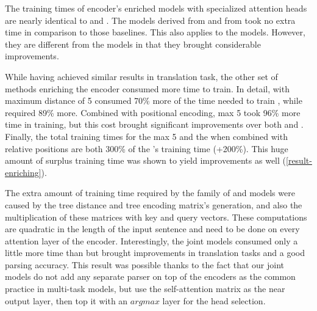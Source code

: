 The training times of encoder's enriched models with specialized attention heads are nearly identical to \transformerbase and \transformerrel.
The \SpecPOS models derived from \transformerbase and from \transformerrel took no extra time in comparison to those baselines.
This also applies to the \SpecDep models. 
However, they are different from the \SpecPOS models in that they brought considerable improvements.

While having achieved similar results in translation task, the other set of methods enriching the encoder consumed more time to train.
In detail, \TreeDistance with maximum distance of 5 consumed 70\% more of the time needed to train \transformerbase, while \TreeTraversal required 89\% more.
Combined with positional encoding, \TreeDistance max 5 took 96\% more time in training, but this cost brought significant improvements over both \transformerbase and \transformerrel.
Finally, the total training times for the \TreeDistance max 5 and the \TreeTraversal when combined with relative positions are both 300\% of the \transformerbase's training time (+200\%).
This huge amount of surplus training time was shown to yield improvements as well (\cref{result-enriching}).

The extra amount of training time required by the family of \TreeDistance and \TreeTraversal models were caused by the tree distance and tree encoding matrix's generation, and also the multiplication of these matrices with key and query vectors.
These computations are quadratic in the length of the input sentence and need to be done on every attention layer of the encoder.
Interestingly, the joint models consumed only a little more time than \transformerbase but brought improvements in translation tasks and a good parsing accuracy.
This result was possible thanks to the fact that our joint models do not add any separate parser on top of the encoders as the common practice in multi-task models, but use the self-attention matrix as the near output layer, then top it with an $argmax$ layer for the head selection.
